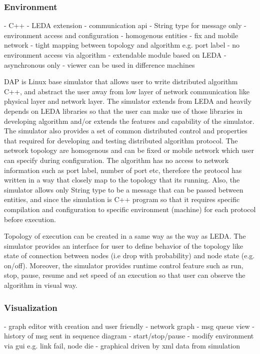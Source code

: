 \subsubsection{Environment}
- C++
- LEDA extension
- communication api
- String type for message only
- environment access and configuration
- homogenous entities
- fix and mobile network
- tight mapping between topology and algorithm e.g. port label
- no environment access via algorithm
- extendable module based on LEDA
- asynchronous only
- viewer can be used in difference machines

DAP is Linux base simulator that allows user to write distributed algorithm C++, and abstract the user away from low layer of network communication like physical layer and network layer. The simulator extends from LEDA and heavily depends on LEDA libraries so that the user can make use of those libraries in developing algorithm and/or extends the features and capability of the simulator. The simulator also provides a set of common distributed control and properties that required for developing and testing distributed algorithm protocol. The network topology are homogenous and can be fixed or mobile network which user can specify during configuration. The algorithm has no access to network information such as port label, number of port etc, therefore the protocol has written in a way that closely map to the topology that its running. Also, the simulator allows only String type to be a message that can be passed between entities, and since the simulation is C++ program so that it requires specific compilation and configuration to specific environment (machine) for each protocol before execution.

Topology of execution can be created in a same way as the way as LEDA. The simulator provides an interface for user to define behavior of the topology like state of connection between nodes (i.e drop with probability) and node state (e.g. on/off). Moreover, the simulator provides runtime control feature such as run, stop, pause, resume and set speed of an execution so that user can observe the algorithm in visual way.

\subsubsection{Visualization}
- graph editor with creation and user friendly
- network graph
- msg queue view
- history of msg sent in sequence diagram
- start/stop/pause
- modify environment via gui e.g. link fail, node die
- graphical driven by xml data from simulation


